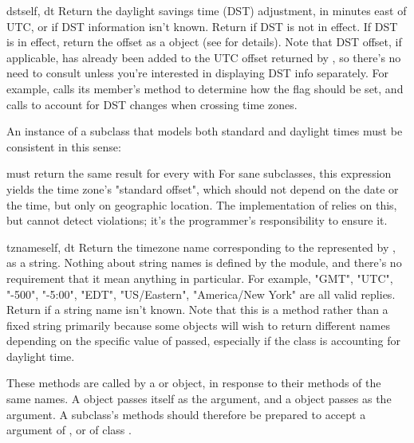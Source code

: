 \begin{methoddesc}{dst}{self, dt}
  Return the daylight savings time (DST) adjustment, in minutes east of
  UTC, or  if DST information isn't known.  Return  if
  DST is not in effect.
  If DST is in effect, return the offset as a
   object (see  for details).
  Note that DST offset, if applicable, has
  already been added to the UTC offset returned by
  , so there's no need to consult 
  unless you're interested in displaying DST info separately.  For
  example,  calls its 
  member's  method to determine how the
   flag should be set, and
   calls  to account for
  DST changes when crossing time zones.

  An instance  of a  subclass that models both
  standard and daylight times must be consistent in this sense:


  must return the same result for every  
  with   For sane  subclasses, this
  expression yields the time zone's "standard offset", which should not
  depend on the date or the time, but only on geographic location.  The
  implementation of  relies on this, but
  cannot detect violations; it's the programmer's responsibility to
  ensure it.

\begin{methoddesc}{tzname}{self, dt}
  Return the timezone name corresponding to the  represented
  by , as a string.  Nothing about string names is defined by the
   module, and there's no requirement that it mean anything
  in particular.  For example, "GMT", "UTC", "-500", "-5:00", "EDT",
  "US/Eastern", "America/New York" are all valid replies.  Return
   if a string name isn't known.  Note that this is a method
  rather than a fixed string primarily because some  objects
  will wish to return different names depending on the specific value
  of  passed, especially if the  class is
  accounting for daylight time.
\end{methoddesc}

\end{methoddesc}

These methods are called by a  or  object,
in response to their methods of the same names.  A 
object passes itself as the argument, and a  object passes
 as the argument.  A  subclass's methods should
therefore be prepared to accept a  argument of , or of
class .

